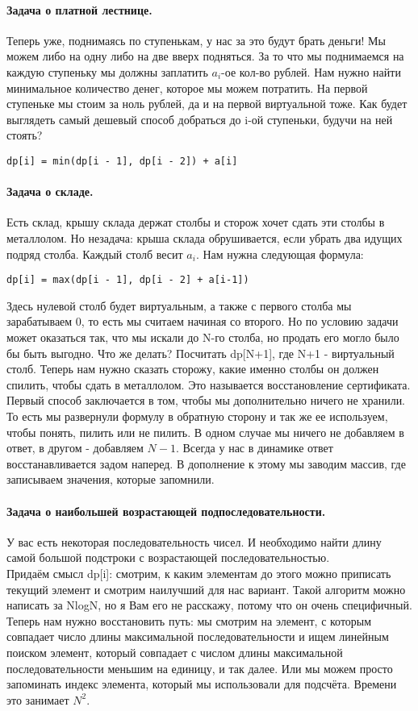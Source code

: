 \documentclass[a4paper,12pt]{article}
\begin{document}
\paragraph{Задача о платной лестнице.}
Теперь уже, поднимаясь по ступенькам, у нас за это будут брать деньги! Мы можем либо на одну либо на две вверх подняться. За то что мы поднимаемся на каждую ступеньку мы должны заплатить $a_i$-ое кол-во рублей. Нам нужно найти минимальное количество денег, которое мы можем потратить. На первой ступеньке мы стоим за ноль рублей, да и на первой виртуальной тоже. Как будет выглядеть самый дешевый способ добраться до i-ой ступеньки, будучи на ней стоять?
\begin{verbatim}
dp[i] = min(dp[i - 1], dp[i - 2]) + a[i]
\end{verbatim}
\paragraph{Задача о складе.}
Есть склад, крышу склада держат столбы и сторож хочет сдать эти столбы в металлолом. Но незадача: крыша склада обрушивается, если убрать два идущих подряд столба. Каждый столб весит $a_i$. Нам нужна следующая формула:
\begin{verbatim}
dp[i] = max(dp[i - 1], dp[i - 2] + a[i-1])
\end{verbatim}
Здесь нулевой столб будет виртуальным, а также с первого столба мы зарабатываем 0, то есть мы считаем начиная со второго. Но по условию задачи может оказаться так, что мы искали до N-го столба, но продать его могло было бы быть выгодно. Что же делать? Посчитать dp[N+1], где N+1 - виртуальный столб. Теперь нам нужно сказать сторожу, какие именно столбы он должен спилить, чтобы сдать в металлолом. Это называется восстановление сертификата. Первый способ заключается в том, чтобы мы дополнительно ничего не хранили. То есть мы развернули формулу в обратную сторону и так же ее используем, чтобы понять, пилить или не пилить. В одном случае мы ничего не добавляем в ответ, в другом - добавляем $N - 1$. Всегда у нас в динамике ответ восстанавливается задом наперед. В дополнение к этому мы заводим массив, где записываем значения, которые запомнили. 
\paragraph{Задача о наибольшей возрастающей подпоследовательности.}
У вас есть некоторая последовательность чисел. И необходимо найти длину самой большой подстроки с возрастающей последовательностью. \\
Придаём смысл dp[i]: смотрим, к каким элементам до этого можно приписать текущий элемент и смотрим наилучший для нас вариант. Такой алгоритм можно написать за NlogN, но я Вам его не расскажу, потому что он очень специфичный. Теперь нам нужно восстановить путь: мы смотрим на элемент, с которым совпадает число длины максимальной последовательности и ищем линейным поиском элемент, который совпадает с числом длины максимальной последовательности меньшим на единицу, и так далее. Или мы можем просто запоминать индекс элемента, который мы использовали для подсчёта. Времени это занимает $N^2$.
\end{document}
